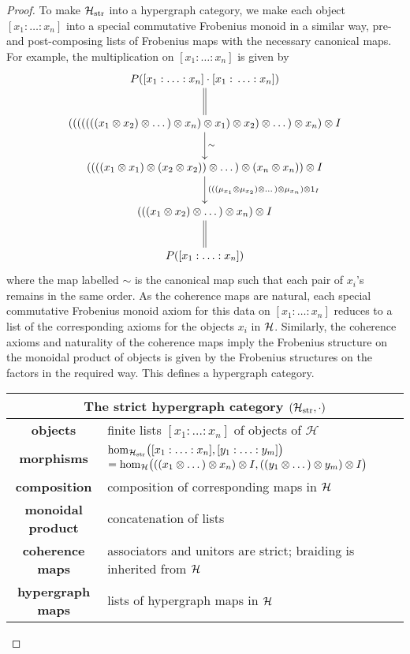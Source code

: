 \begin{proof}
  To make $\mathcal H_{\mathrm{str}}$ into a hypergraph category, we make each
  object $[x_1:\ldots:x_n]$ into a special commutative Frobenius monoid in a
  similar way, pre- and post-composing lists of Frobenius maps with the
  necessary canonical maps. For example, the multiplication on $[x_1:\ldots:x_n]$
  is given by 
  \[
    \xymatrix{
      P([x_1:\ldots:x_n]\cdot[x_1:\,\ldots:x_n])
      \ar@{=}[d]
      \\ (((((((x_1 \ot x_2) \ot \dots) \ot x_n) \ot x_1) \ot x_2) \ot \dots)
      \ot x_n) \ot I
  \ar[d]^{\sim} \\
      ((((x_1 \ot x_1) \ot (x_2 \ot x_2)) \ot \dots) \ot (x_n \ot x_n)) \ot I
      \ar[d]^{(((\mu_{x_1} \ot \mu_{x_2}) \ot \dots ) \ot \mu_{x_n}) \ot 1_I}
      \\
      (((x_1 \ot x_2) \ot \dots ) \ot x_n) \ot I \ar@{=}[d]\\
      P([x_1:\ldots:x_n])
    }
  \]
  where the map labelled $\sim$ is the canonical map such that each pair of $x_i$'s
  remains in the same order. As the coherence maps are natural, each special
  commutative Frobenius monoid axiom for this data on $[x_1:\ldots:x_n]$ reduces
  to a list of the corresponding axioms for the objects $x_i$ in $\mathcal H$.
  Similarly, the coherence axioms and naturality of the coherence maps imply the
  Frobenius structure on the monoidal product of objects is given by the
  Frobenius structures on the factors in the required way. This defines a
  hypergraph category.
  \smallskip

  \begin{center}
    \begin{tabular}{| c | p{} |}
      \hline
      \multicolumn{2}{|c|}{The strict hypergraph category $(\mathcal H_{\mathrm{str}},
      \cdot)$} \\
      \hline
      \textbf{objects} & finite lists $[x_1: \ldots: x_n]$ of objects of
      $\mathcal H$ \\ 
      \textbf{morphisms} & $\mathrm{hom}_{\mathcal H_{\mathrm{str}}}\big([x_1: \ldots:
      x_n],[y_1: \ldots: y_m]\big)$ \newline $= \mathrm{hom}_{\mathcal H}\big(((x_1 \otimes
      \dots) \otimes x_n) \otimes I, ((y_1 \otimes \dots) \otimes y_m) \otimes I\big)$\\ 
      \textbf{composition} & composition of corresponding maps in $\mathcal H$ \\
      \textbf{monoidal product} & concatenation of lists \\
      \textbf{coherence maps} & associators and unitors are strict; braiding is
      inherited from $\mathcal H$  \\
      \textbf{hypergraph maps} & lists of hypergraph maps in $\mathcal H$ \\
      \hline
    \end{tabular}
  \end{center}
  \smallskip


\end{proof}
